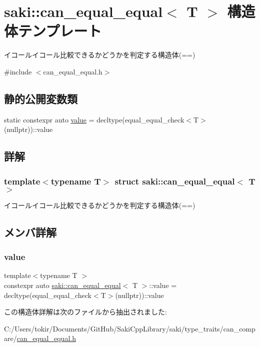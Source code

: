\hypertarget{structsaki_1_1can__equal__equal}{}\section{saki\+:\+:can\+\_\+equal\+\_\+equal$<$ T $>$ 構造体テンプレート}
\label{structsaki_1_1can__equal__equal}


イコールイコール比較できるかどうかを判定する構造体(==)  




{\ttfamily \#include $<$can\+\_\+equal\+\_\+equal.\+h$>$}

\subsection*{静的公開変数類}
\begin{DoxyCompactItemize}
\item 
static constexpr auto \mbox{\hyperlink{structsaki_1_1can__equal__equal_a260408f1ad1896949ac2f75caa272211}{value}} = decltype(equal\+\_\+equal\+\_\+check$<$T$>$(nullptr))\+::value
\end{DoxyCompactItemize}


\subsection{詳解}
\subsubsection*{template$<$typename T$>$\newline
struct saki\+::can\+\_\+equal\+\_\+equal$<$ T $>$}

イコールイコール比較できるかどうかを判定する構造体(==) 

\subsection{メンバ詳解}
\mbox{\label{structsaki_1_1can__equal__equal_a260408f1ad1896949ac2f75caa272211}} 
\subsubsection{\texorpdfstring{value}{value}}
{\footnotesize\ttfamily template$<$typename T $>$ \\
constexpr auto \mbox{\hyperlink{structsaki_1_1can__equal__equal}{saki\+::can\+\_\+equal\+\_\+equal}}$<$ T $>$\+::value = decltype(equal\+\_\+equal\+\_\+check$<$T$>$(nullptr))\+::value\hspace{0.3cm}{\ttfamily [static]}}



この構造体詳解は次のファイルから抽出されました\+:\begin{DoxyCompactItemize}
\item 
C\+:/\+Users/tokir/\+Documents/\+Git\+Hub/\+Saki\+Cpp\+Library/saki/type\+\_\+traits/can\+\_\+compare/\mbox{\hyperlink{can__equal__equal_8h}{can\+\_\+equal\+\_\+equal.\+h}}\end{DoxyCompactItemize}
